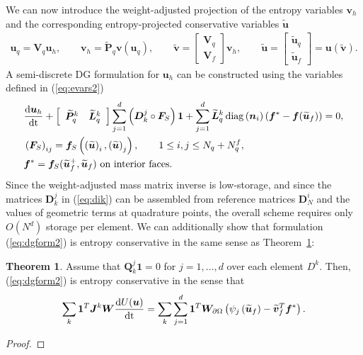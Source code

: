 \documentclass[preprint,10pt]{article}
\theoremstyle{definition}
\theoremstyle{lemma}
\theoremstyle{theorem}
\newtheorem{theorem}{Theorem}
\theoremstyle{assumption}
\DeclareMathOperator{\diag}{diag}
\renewcommand{\tilde}{\widetilde}
\newcommand{\td}[2]{\frac{{\rm d}#1}{{\rm d}{\rm #2}}}
\newcommand{\LRp}[1]{\left( #1 \right)}
\newcommand{\LRs}[1]{\left[ #1 \right]}
\begin{document}
{We can now introduce the weight-adjusted projection of the entropy variables $\bm{v}_h$ and the corresponding entropy-projected conservative variables $\tilde{\bm{u}}$ 
\begin{align}
\bm{u}_q = \bm{V}_q \bm{u}_h, \qquad \bm{v}_h = \tilde{\bm{P}}_q \bm{v}\LRp{\bm{u}_q}, \qquad 
\tilde{\bm{v}} = \LRs{\begin{array}{c}
\bm{V}_q\\
\bm{V}_f
\end{array}}\bm{v}_h, \qquad \tilde{\bm{u}} =  \LRs{\begin{array}{c}
\tilde{\bm{u}}_q\\
\tilde{\bm{u}}_f
\end{array}} = \bm{u}\LRp{\tilde{\bm{v}}}.
\label{eq:evars2}
\end{align}
A semi-discrete DG formulation for $\bm{u}_h$ can be constructed using the variables defined in (\ref{eq:evars2})
\begin{align}
&\td{\bm{u}_h}{t} + \LRs{\begin{array}{cc}\tilde{\bm{P}}^k_q & \tilde{\bm{L}}^k_q\end{array}}
\sum_{j=1}^d \LRp{\bm{D}^j_k \circ \bm{F}_S}\bm{1} + \sum_{j=1}^d \tilde{\bm{L}}^k_q \diag\LRp{\bm{n}_i}\LRp{\bm{f}^* - \bm{f}(\tilde{\bm{u}}_f)} = 0,\label{eq:dgform2}\\
&\LRp{\bm{F}_S}_{ij} = \bm{f}_S\LRp{\LRp{\tilde{\bm{u}}}_i,\LRp{\tilde{\bm{u}}}_j}, \qquad 1 \leq i,j \leq N_q + N^f_q,\nonumber\\
&\bm{f}^* = \bm{f}_S(\tilde{\bm{u}}_f^+,\tilde{\bm{u}}_f) \text{ on interior faces}.\nonumber
\end{align}
Since the  weight-adjusted mass matrix inverse is low-storage, and since the matrices $\bm{D}^j_k$ in (\ref{eq:dik}) can be assembled from reference matrices $\bm{D}^i_N$ and the values of geometric terms at quadrature points, the overall scheme requires only $O(N^d)$ storage per element.  We can additionally show that formulation (\ref{eq:dgform2}) is entropy conservative in the same sense as Theorem~\ref{thm:stab2}: 
\begin{theorem}
Assume that $\bm{Q}^j_k\bm{1} = 0$ for $j = 1,\ldots,d$ over each element $D^k$.  Then, (\ref{eq:dgform2}) is entropy conservative in the sense that
\[
\sum_k \bm{1}^T\bm{J}^k\bm{W}\td{U(\bm{u})}{t} = \sum_k \sum_{j=1}^d \bm{1}^T\bm{W}_{\partial \Omega} \LRp{\psi_j\LRp{\tilde{\bm{u}}_f}-\tilde{\bm{v}}_f^T\bm{f}^*}.
\]
\label{thm:stab2}
\end{theorem}
\begin{proof}

\end{proof}}
\end{document}
